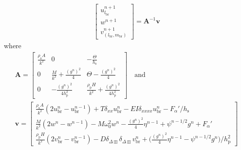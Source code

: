 \documentclass{article}
\begin{document}
\begin{align}
\begin{bmatrix}
        u^{n+1}_{l_\text{br}}\\
        w^{n+1}\\
        v^{n+1}_{(l_\text{br}, m_\text{br})}
    \end{bmatrix}
    = 
    \mathbf{A}^{-1}\mathbf{v}
\end{align}
where
\begin{equation}
\begin{gathered}
\mathbf{A} = 
    \begin{bmatrix}
        \frac{\rho_\text{s} A}{k^2} & 0 & - \frac{\Theta}{h_\text{s}}\\
        0 & \frac{M}{k^2}+\frac{(g^n)^2}{4} &\Theta-\frac{(g^n)^2}{4}\\
        0 & -\frac{(g^n)^2}{4h_\text{p}^2} & \frac{\rho_\text{p}H}{k^2} + \frac{(g^n)^2}{4h_\text{p}^2}
    \end{bmatrix}
    \quad \text{and}\\
    \mathbf{v} = 
    \begin{bmatrix}
        \frac{\rho_\text{s} A}{k^2}(2u^n_\text{br}-u_\text{br}^{n-1})+T\delta_{xx}u_\text{br}^n-EI\delta_{xxxx}u_\text{br}^n - F_\alpha'/h_\text{s}\\
        \frac{M}{k^2}(2w^n-w^{n-1})-M\omega_0^2w^n-\frac{(g^n)^2}{4}\eta^{n-1}+\psi^{n-1/2}g^n + F_\alpha'\\
        \frac{\rho_\text{p}H}{k^2}(2v_\text{br}^n-v_\text{br}^{n-1})-D\delta_{\Delta\boxplus}\delta_{\Delta\boxplus}v_\text{br}^n+\Big(\frac{(g^n)^2}{4}\eta^{n-1}-\psi^{n-1/2}g^n\Big)/h_\text{p}^2
    \end{bmatrix}
    \nonumber
\end{gathered}
\end{equation}
\end{document}
